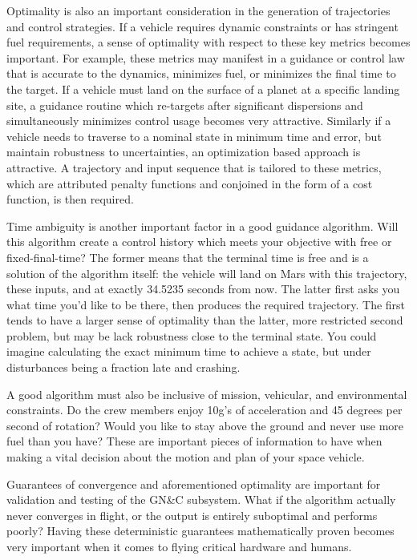 Optimality is also an important consideration in the generation of trajectories and control strategies. If a vehicle requires dynamic constraints or has stringent fuel requirements, a sense of optimality with respect to these key metrics becomes important. For example, these metrics may manifest in a guidance or control law that is accurate to the dynamics, minimizes fuel, or minimizes the final time to the target. If a vehicle must land on the surface of a planet at a specific landing site, a guidance routine which re-targets after significant dispersions and simultaneously minimizes control usage becomes very attractive. Similarly if a vehicle needs to traverse to a nominal state in minimum time and error, but maintain robustness to uncertainties, an optimization based approach is attractive. A trajectory and input sequence that is tailored to these metrics, which are attributed penalty functions and conjoined in the form of a cost function, is then required.

Time ambiguity is another important factor in a good guidance algorithm. Will this algorithm create a control history which meets your objective with free or fixed-final-time? The former means that the terminal time is free and is a solution of the algorithm itself: the vehicle will land on Mars with this trajectory, these inputs, and at exactly 34.5235 seconds from now. The latter first asks you what time you'd like to be there, then produces the required trajectory. The first tends to have a larger sense of optimality than the latter, more restricted second problem, but may be lack robustness close to the terminal state. You could imagine calculating the exact minimum time to achieve a state, but under disturbances being a fraction late and crashing.

A good algorithm must also be inclusive of mission, vehicular, and environmental constraints. Do the crew members enjoy 10g's of acceleration and 45 degrees per second of rotation? Would you like to stay above the ground and never use more fuel than you have? These are important pieces of information to have when making a vital decision about the motion and plan of your space vehicle.

Guarantees of convergence and aforementioned optimality are important for validation and testing of the GN\&C subsystem. What if the algorithm actually never converges in flight, or the output is entirely suboptimal and performs poorly? Having these deterministic guarantees mathematically proven becomes very important when it comes to flying critical hardware and humans.

